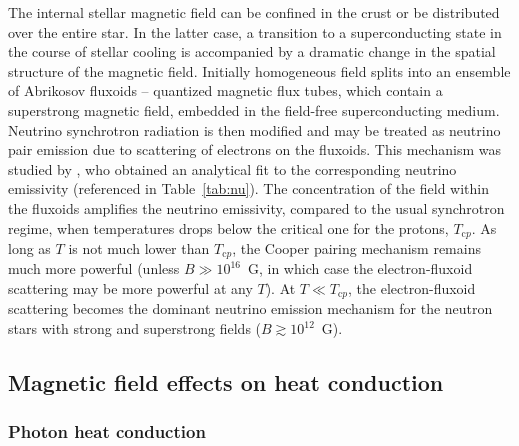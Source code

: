 \documentclass[smallextended]{svjour3}       %
\newcommand{\Tcp}{T_{\mathrm{c}p}}
\begin{document}
The internal stellar magnetic field can be confined in the crust or be
distributed over the entire star. In the latter case, a
transition to a superconducting state in the course of
stellar cooling is accompanied by a dramatic change in the
spatial structure of the magnetic field. Initially
homogeneous field splits into an ensemble of Abrikosov
fluxoids -- quantized magnetic flux tubes, which contain a
superstrong magnetic field, embedded in the field-free
superconducting medium. Neutrino synchrotron radiation is
then modified and may be treated as neutrino pair emission
due to scattering of electrons on the fluxoids. This
mechanism was studied by \citet{KaminkerYH97}, who obtained
an analytical fit to the corresponding neutrino emissivity
(referenced in Table~\ref{tab:nu}). The concentration of the
field within the fluxoids  amplifies the neutrino
emissivity, compared to the usual synchrotron regime, when
temperatures drops below the critical one for the protons,
$\Tcp$. As long as $T$ is not much lower than $\Tcp$, the
Cooper pairing mechanism remains much more powerful (unless
$B\gg10^{16}$~G, in which case the electron-fluxoid
scattering may be more powerful at any $T$). At $T\ll \Tcp$,
the electron-fluxoid scattering becomes the dominant
neutrino emission mechanism for the neutron stars with
strong and superstrong fields ($B\gtrsim10^{12}$~G).

\subsection{Magnetic field effects on heat conduction}
\label{sect:condmag}

\subsubsection{Photon heat conduction}
\label{sect:radiopa}
\end{document}
